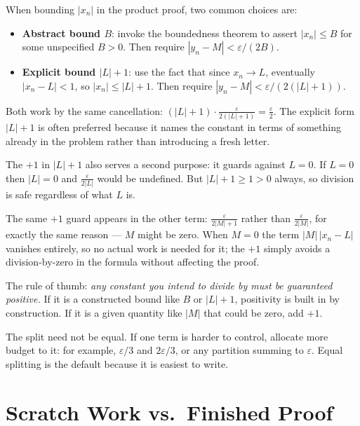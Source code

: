 \begin{remark*}
When bounding $|x_n|$ in the product proof, two common choices are:
\begin{itemize}
  \item \textbf{Abstract bound $B$}: invoke the boundedness theorem to
        assert $|x_n| \le B$ for some unspecified $B > 0$.
        Then require $|y_n - M| < \varepsilon/(2B)$.
  \item \textbf{Explicit bound $|L|+1$}: use the fact that since
        $x_n \to L$, eventually $|x_n - L| < 1$, so
        $|x_n| \le |L| + 1$.
        Then require $|y_n - M| < \varepsilon/(2(|L|+1))$.
\end{itemize}
Both work by the same cancellation: $(|L|+1) \cdot \frac{\varepsilon}{2(|L|+1)} = \frac{\varepsilon}{2}$.
The explicit form $|L|+1$ is often preferred because it names the
constant in terms of something already in the problem rather than
introducing a fresh letter.

The $+1$ in $|L|+1$ also serves a second purpose: it guards against
$L = 0$.
If $L = 0$ then $|L| = 0$ and $\frac{\varepsilon}{2|L|}$ would be
undefined.
But $|L| + 1 \ge 1 > 0$ always, so division is safe regardless of
what $L$ is.

The same $+1$ guard appears in the other term: $\frac{\varepsilon}{2|M|+1}$
rather than $\frac{\varepsilon}{2|M|}$, for exactly the same reason —
$M$ might be zero.
When $M = 0$ the term $|M|\,|x_n - L|$ vanishes entirely, so no
actual work is needed for it; the $+1$ simply avoids a division-by-zero
in the formula without affecting the proof.

\medskip
\noindent The rule of thumb: \emph{any constant you intend to divide by
must be guaranteed positive.}
If it is a constructed bound like $B$ or $|L|+1$, positivity is
built in by construction.
If it is a given quantity like $|M|$ that could be zero, add $+1$.
\end{remark*}

\begin{remark*}
The split need not be equal.
If one term is harder to control, allocate more budget to it:
for example, $\varepsilon/3$ and $2\varepsilon/3$, or any partition
summing to $\varepsilon$.
Equal splitting is the default because it is easiest to write.
\end{remark*}

\section{Scratch Work vs.\ Finished Proof}
\label{sec:scratch-work}

